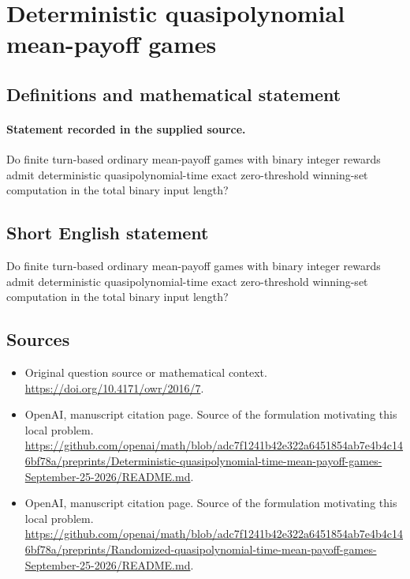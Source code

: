 \documentclass[11pt]{article}
\begin{document}
\section*{Deterministic quasipolynomial mean-payoff games}\label{statement}
\subsection{Definitions and mathematical statement}
\paragraph{Statement recorded in the supplied source.}
Do finite turn-based ordinary mean-payoff games with binary integer rewards admit deterministic quasipolynomial-time exact zero-threshold winning-set computation in the total binary input length?
\subsection{Short English statement}
Do finite turn-based ordinary mean-payoff games with binary integer rewards admit deterministic quasipolynomial-time exact zero-threshold winning-set computation in the total binary input length?
\subsection{Sources}
\begin{itemize}
\item[S1] Original question source or mathematical context.
\url{https://doi.org/10.4171/owr/2016/7}.
\item[S2] OpenAI, manuscript citation page. Source of the formulation motivating this local problem.
\url{https://github.com/openai/math/blob/adc7f1241b42e322a6451854ab7e4b4c146bf78a/preprints/Deterministic-quasipolynomial-time-mean-payoff-games-September-25-2026/README.md}.
\item[S3] OpenAI, manuscript citation page. Source of the formulation motivating this local problem.
\url{https://github.com/openai/math/blob/adc7f1241b42e322a6451854ab7e4b4c146bf78a/preprints/Randomized-quasipolynomial-time-mean-payoff-games-September-25-2026/README.md}.
\end{itemize}
\end{document}
